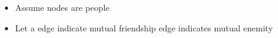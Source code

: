 \documentclass[preview]{standalone}
\begin{document}
\begin{center}
\begin{itemize} \item Assume nodes are people \\ \item Let a \color{Blue}{Blue} edge indicate mutual friendship \color{Red}{Red} edge indicates mutual enemity \end{itemize}
\end{center}
\end{document}
